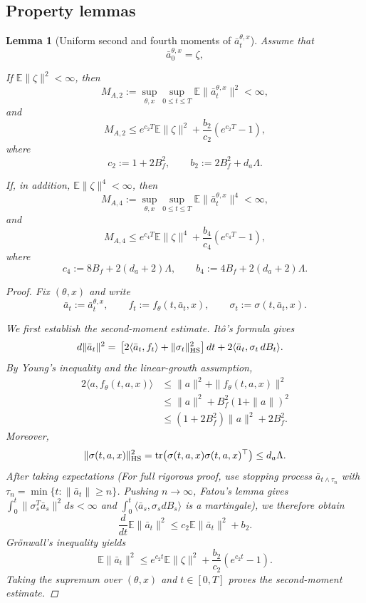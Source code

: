 \documentclass{article}
\newtheorem{lem}[thm]{Lemma}
\theoremstyle{definition}
\theoremstyle{remark}
\theoremstyle{mystyle}
\newcommand{\E}{\mathbb{E}}
\newcommand{\1}{\mathbbm{1}}
\begin{document}
\subsection{Property lemmas}

\begin{lem}[Uniform second and fourth moments of
\(\bar a_t^{\theta,x}\)]
Assume that
\[
\bar a_0^{\theta,x}=\zeta,
\]

If \(\mathbb E\|\zeta\|^2<\infty\), then
\[
M_{A,2}
:=
\sup_{\theta,x}\sup_{0\le t\le T}
\mathbb E\|\bar a_t^{\theta,x}\|^2
<\infty,
\]
and
\[
M_{A,2}
\le
e^{c_2T}\mathbb E\|\zeta\|^2
+
\frac{b_2}{c_2}\left(e^{c_2T}-1\right),
\]
where
\[
c_2:=1+2B_f^2,
\qquad
b_2:=2B_f^2+d_a\Lambda.
\]

If, in addition, \(\mathbb E\|\zeta\|^4<\infty\), then
\[
M_{A,4}
:=
\sup_{\theta,x}\sup_{0\le t\le T}
\mathbb E\|\bar a_t^{\theta,x}\|^4
<\infty,
\]
and
\[
M_{A,4}
\le
e^{c_4T}\mathbb E\|\zeta\|^4
+
\frac{b_4}{c_4}\left(e^{c_4T}-1\right),
\]
where
\[
c_4:=8B_f+2(d_a+2)\Lambda,
\qquad
b_4:=4B_f+2(d_a+2)\Lambda.
\]

\begin{proof}
Fix \((\theta,x)\) and write
\[
\bar a_t:=\bar a_t^{\theta,x},
\qquad
f_t:=f_\theta(t,\bar a_t,x),
\qquad
\sigma_t:=\sigma(t,\bar a_t,x).
\]

We first establish the second-moment estimate. It\^o's
formula gives
\[
\begin{aligned}
d\|\bar a_t\|^2
={}&
\left[
2\langle\bar a_t,f_t\rangle
+
\|\sigma_t\|_{\rm HS}^2
\right]dt
+
2\langle\bar a_t,\sigma_t\,dB_t\rangle.
\end{aligned}
\]
By Young's inequality and the linear-growth assumption,
\[
\begin{aligned}
2\langle a,f_\theta(t,a,x)\rangle
&\le
\|a\|^2+\|f_\theta(t,a,x)\|^2\\
&\le
\|a\|^2+B_f^2(1+\|a\|)^2\\
&\le
(1+2B_f^2)\|a\|^2+2B_f^2.
\end{aligned}
\]
Moreover,
\[
\|\sigma(t,a,x)\|_{\rm HS}^2
=
\operatorname{tr}\!\left(
\sigma(t,a,x)\sigma(t,a,x)^\top
\right)
\le d_a\Lambda.
\]
After taking expectations (For full rigorous proof, use stopping process $\bar{a}_{t\wedge\tau_n} $ with $\tau_n=\min\{t:\|\bar{a}_t\|\geq n\}$. Pushing $n\to \infty$, Fatou's lemma gives $\int^t_0 \|\sigma_s^T\bar{a}_s\|^2ds<\infty$ and $\int^t_0 \langle\bar{a}_s,\sigma_sdB_s\rangle$ is a martingale), we therefore obtain
\[
\frac{d}{dt}\mathbb E\|\bar a_t\|^2
\le
c_2\mathbb E\|\bar a_t\|^2+b_2.
\]
Gr\"onwall's inequality yields
\[
\mathbb E\|\bar a_t\|^2
\le
e^{c_2t}\mathbb E\|\zeta\|^2
+
\frac{b_2}{c_2}\left(e^{c_2t}-1\right).
\]
Taking the supremum over \((\theta,x)\) and \(t\in[0,T]\) proves the
second-moment estimate.


\end{proof}
\end{lem}
\end{document}
